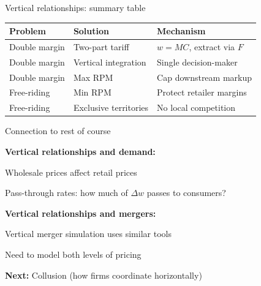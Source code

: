 \documentclass[notes,11pt, aspectratio=169]{beamer}
\newenvironment{wideitemize}{\itemize\addtolength{\itemsep}{10pt}}{\enditemize}
\begin{document}
\begin{frame}{Vertical relationships: summary table}
	\begin{center}
	\begin{tabular}{|l|l|l|}
		\hline
		\textbf{Problem} & \textbf{Solution} & \textbf{Mechanism} \\
		\hline
		Double margin & Two-part tariff & $w = MC$, extract via $F$ \\
		\hline
		Double margin & Vertical integration & Single decision-maker \\
		\hline
		Double margin & Max RPM & Cap downstream markup \\
		\hline
		Free-riding & Min RPM & Protect retailer margins \\
		\hline
		Free-riding & Exclusive territories & No local competition \\
		\hline
	\end{tabular}
	\end{center}
\end{frame}

\begin{frame}{Connection to rest of course}
	\begin{wideitemize}
		\item \textbf{Vertical relationships and demand:}
		\begin{wideitemize}
			\vspace{5pt}
			\item Wholesale prices affect retail prices
			\item Pass-through rates: how much of $\Delta w$ passes to consumers?
		\end{wideitemize}
		\item \textbf{Vertical relationships and mergers:}
		\begin{wideitemize}
			\vspace{5pt}
			\item Vertical merger simulation uses similar tools
			\item Need to model both levels of pricing
		\end{wideitemize}
		\item \textbf{Next:} Collusion (how firms coordinate horizontally)
	\end{wideitemize}
\end{frame}

\end{document}

